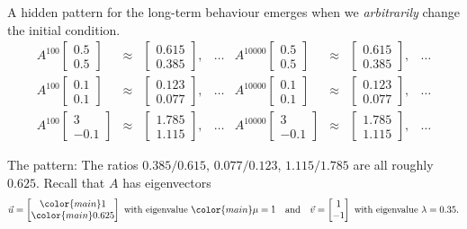\documentclass[../main.tex]{subfiles}
\begin{document}
A hidden pattern for the long-term behaviour emerges when we \emph{arbitrarily} change the initial condition.
\[
  \begin{array}{rclcrclc}
    A^{100} \begin{bmatrix} 0.5 \\ 0.5 \end{bmatrix} &\approx& \begin{bmatrix} 0.615 \\ 0.385 \end{bmatrix}, &\dots&
    A^{10000} \begin{bmatrix} 0.5 \\ 0.5 \end{bmatrix} &\approx& \begin{bmatrix} 0.615 \\ 0.385 \end{bmatrix}, &\dots \\[2ex]
    A^{100} \begin{bmatrix} 0.1 \\ 0.1 \end{bmatrix} &\approx& \begin{bmatrix} 0.123 \\ 0.077 \end{bmatrix}, &\dots&
    A^{10000} \begin{bmatrix} 0.1 \\ 0.1 \end{bmatrix} &\approx& \begin{bmatrix} 0.123 \\ 0.077 \end{bmatrix}, &\dots \\[2ex]
    A^{100} \begin{bmatrix} 3 \\ -0.1 \end{bmatrix} &\approx& \begin{bmatrix} 1.785 \\ 1.115 \end{bmatrix}, &\dots&
    A^{10000} \begin{bmatrix} 3 \\ -0.1 \end{bmatrix} &\approx& \begin{bmatrix} 1.785 \\ 1.115 \end{bmatrix}, &\dots
  \end{array}
\]

The pattern: The ratios \(0.385/0.615\), \(0.077 / 0.123\), \(1.115 / 1.785\)   are all roughly \(0.625\).
Recall that \(A\) has eigenvectors 
\[
  \vec{u} = \begin{bmatrix} {\color{main} 1} \\ {\color{main} 0.625} \end{bmatrix} \text{ with eigenvalue } {\color{main} \mu = 1}
  \quad\text{and}\quad
  \vec{v} = \begin{bmatrix}1 \\ -1 \end{bmatrix} \text{ with eigenvalue } \lambda = 0.35.
\]
\end{document}
